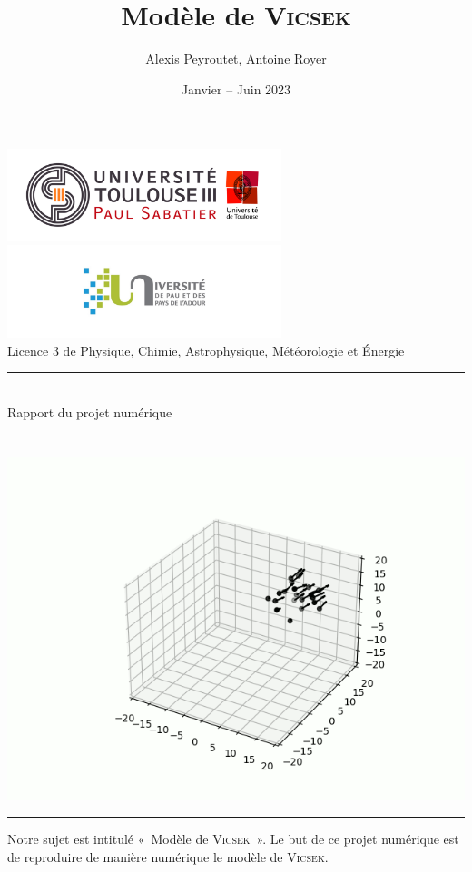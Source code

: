 \documentclass[french, a4paper, 12pt, openany]{report}
\title{\sc Modèle de \textsc{Vicsek}}
\author{Alexis {\sc Peyroutet}, Antoine {\sc Royer}}
\date{Janvier – Juin 2023}
\begin{document}
\makeatletter
\begin{titlepage}
	\centering
	
	\includegraphics[width=8cm]{images/ut3.png} \hfill \includegraphics[width=8cm]{images/uppa.png} \\
	{\large{\sc Licence 3 de Physique, Chimie, Astrophysique, Météorologie et Énergie}} \\
	\rule{0.5\linewidth}{0.4pt} \\
	{\sc Rapport du projet numérique} \\
	
	
	\vfill
	{\huge {\sc \@title}} \\ \vspace{1cm}
	{\Large \@author} \\
	
	\vfill 
	\includegraphics[width=0.7\linewidth]{images/page_garde.png}
	\vfill
	{\Large \@date}
	\rule{\linewidth}{0.4pt}
\end{titlepage}
\makeatother

\tableofcontents



	Notre sujet est intitulé «~Modèle de \textsc{Vicsek}~». Le but de ce projet numérique est de reproduire de manière numérique le modèle de \textsc{Vicsek}.
\end{document}
